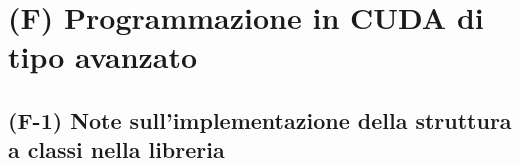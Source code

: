 \chapter{(F) Programmazione in CUDA di tipo avanzato} \label{cap:cudacpp}

\section{(F-1) Note sull'implementazione della struttura a classi nella libreria}
\lipsum[1-3]